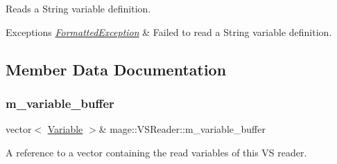 Reads a String variable definition.


\begin{DoxyExceptions}{Exceptions}
{\em \hyperlink{classmage_1_1_formatted_exception}{Formatted\+Exception}} & Failed to read a String variable definition. \\
\hline
\end{DoxyExceptions}


\subsection{Member Data Documentation}
\hypertarget{classmage_1_1_v_s_reader_a535a576912adc3dadb1523280b5e5fc3}{}\label{classmage_1_1_v_s_reader_a535a576912adc3dadb1523280b5e5fc3} 
\subsubsection{\texorpdfstring{m\+\_\+variable\+\_\+buffer}{m\_variable\_buffer}}
{\footnotesize\ttfamily vector$<$ \hyperlink{structmage_1_1_variable}{Variable} $>$\& mage\+::\+V\+S\+Reader\+::m\+\_\+variable\+\_\+buffer\hspace{0.3cm}{\ttfamily [private]}}

A reference to a vector containing the read variables of this VS reader. 